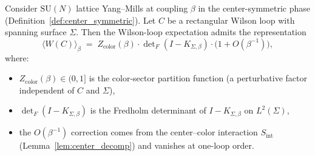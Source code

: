 \begin{theorem}
\label{thm:cvfr}
Consider $\mathrm{SU}(N)$ lattice Yang--Mills at coupling $\beta$
in the center-symmetric phase
(Definition~\ref{def:center_symmetric}). Let $C$ be a rectangular
Wilson loop with spanning surface $\Sigma$. Then the Wilson-loop
expectation admits the representation
\begin{equation}
\label{eq:cvfr}
  \langle W(C)\rangle_{\beta}
  \;=\;Z_{\mathrm{color}}(\beta)\cdot
  \det\nolimits_{F}(I-K_{\Sigma,\beta})\cdot
  \bigl(1+O(\beta^{-1})\bigr),
\end{equation}
where:
\begin{itemize}
\item $Z_{\mathrm{color}}(\beta)\in(0,1]$ is the color-sector
partition function (a perturbative factor independent of $C$ and
$\Sigma$),
\item $\det_{F}(I-K_{\Sigma,\beta})$ is the Fredholm determinant
of $I-K_{\Sigma,\beta}$ on $L^{2}(\Sigma)$,
\item the $O(\beta^{-1})$ correction comes from the
center--color interaction $S_{\mathrm{int}}$
(Lemma~\ref{lem:center_decomp}) and vanishes at one-loop order.
\end{itemize}
\end{theorem}

